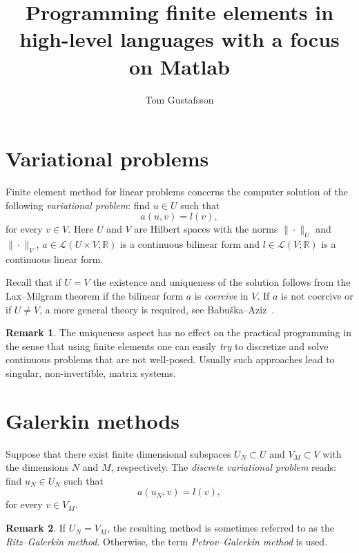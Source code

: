 \documentclass{amsart}
\title[Programming finite elements in Matlab]{Programming finite elements in high-level languages with a focus on Matlab}
\author{Tom Gustafsson}
\theoremstyle{definition}
\newtheorem{remark}{Remark}
\begin{document}
\maketitle

\tableofcontents

\section{Variational problems}

Finite element method for linear problems concerns the computer
solution of the following \emph{variational problem}: find $u
\in U$ such that
\begin{equation}
  a(u,v) = l(v),
\end{equation}
for every $v \in V$. Here $U$ and $V$ are Hilbert spaces with the
norms $\|\cdot\|_U$ and $\|\cdot\|_V$, $a \in \mathcal{L}(U \times V;
\mathbb{R})$ is a continuous bilinear form and $l \in
\mathcal{L}(V;\mathbb{R})$ is a continuous linear form.

Recall that if $U=V$ the existence and uniqueness of the solution
follows from the Lax--Milgram theorem if the bilinear form $a$ is
\emph{coercive} in $V$. If $a$ is not coercive or if $U\neq V$, a more
general theory is required, see Babu\v{s}ka--Aziz~\cite{BA72}.

\begin{remark}
    The uniqueness aspect has no effect on the practical programming
in the sense that using finite elements one can easily \emph{try} to
discretize and solve continuous problems that are not
well-posed. Usually such approaches lead to singular,
non-invertible, matrix systems.
\end{remark}

\section{Galerkin methods}

Suppose that there exist finite dimensional subspaces $U_N \subset U$
and $V_M \subset V$ with the dimensions $N$ and $M$, respectively. The
\emph{discrete variational problem} reads: find $u_N \in U_N$ such
that
\begin{equation}
  \label{eq:dweakf}
  a(u_N,v) = l(v),
\end{equation}
for every $v \in V_M$.

\begin{remark}
  If $U_N = V_M$, the resulting method is sometimes referred to as the
  \emph{Ritz--Galerkin method}. Otherwise, the term
  \emph{Petrov--Galerkin method} is used.
\end{remark}
\end{document}
